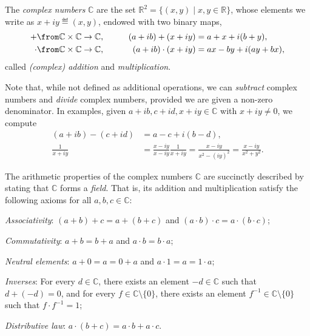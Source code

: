 \documentclass[a4paper,oneside, 12pt]{amsart}
\begin{document}
\begin{definition}\label{def:complex-numbers}
  The \emph{complex numbers} \( \mathbb{C} \) are the set \( \mathbb{R}^2 = \{(x, y) \mid x, y \in \mathbb{R}\} \), whose elements we write as \(x+iy\eqdef (x,y)\), endowed with two binary maps,
  \begin{align*}
    + & \from \mathbb{C} \times \mathbb{C} \to \mathbb{C}, \qquad & (a+ ib) + (x + iy) &= a+x + i(b+y), \\
    \cdot & \from \mathbb{C} \times \mathbb{C} \to \mathbb{C}, \qquad &   (a+ ib) \cdot (x +iy) &= ax - by +i(ay + bx),
  \end{align*}
  called \emph{(complex) addition} and \emph{multiplication}.
\end{definition}

Note that, while not defined as additional operations, we can \emph{subtract} complex numbers and \emph{divide} complex numbers, provided we are given a non-zero denominator.
In examples,
given \(a+ib, c+id, x+iy \in \mathbb{C}\) with \(x+iy \neq 0\), we compute
\begin{align*}
  (a+ib) - (c+id)
  & = a-c + i(b-d), \\
  \frac{1}{x+iy}
  & = \frac{x - iy}{x - iy} \frac{1}{x + iy}
    = \frac{x - iy}{x^{2} - (iy)^{2}}
    = \frac{x - iy}{x^{2}+y^{2}}.
\end{align*}

The arithmetic properties of the  complex numbers \( \mathbb{C} \) are  succinctly described by stating that \( \mathbb{C}\) forms a \emph{field}.
That is, its addition and multiplication satisfy the following axioms for all \( a, b, c \in \mathbb{C} \):

\begin{thmlist}
  \item \emph{Associativity}: \((a + b) + c = a + (b + c)\) and \((a \cdot b) \cdot c = a \cdot (b \cdot c)\);
  \item \emph{Commutativity}: \( a + b = b + a \) and \( a \cdot b = b \cdot a \);
  \item \emph{Neutral elements}: \( a + 0 = a = 0 + a \) and \( a \cdot 1 = a = 1 \cdot a \);
  \item \emph{Inverses}: For every \( d \in \mathbb{C} \), there exists an element \( -d \in \mathbb{C} \) such that \( d + (-d) = 0 \), and for every \( f \in \mathbb{C} \setminus \{0\} \), there exists an element \( f^{-1} \in \mathbb{C}\setminus\{ 0\}\) such that \( f \cdot f^{-1} = 1 \);
  \item \emph{Distributive law}: \( a \cdot (b + c) = a \cdot b + a \cdot c \).
\end{thmlist}
\end{document}
